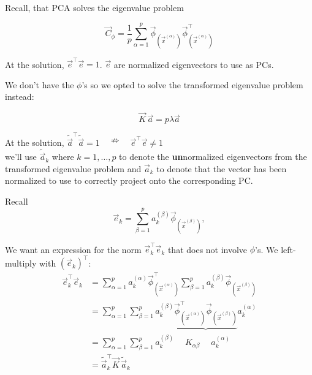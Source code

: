 \begin{frame}{\subsubsecname}

Recall, that PCA solves the eigenvalue problem

\begin{equation} 
\vec C_{\phi} = \frac{1}{p} \sum_{\alpha=1}^{p} \vec{\phi}_{(\vec{x}^{(\alpha)})} \vec{\phi}^{\top}_{(\vec{x}^{(\alpha)})}
\end{equation}

At the solution, $\vec e^\top \vec e = 1$. $\vec e$ are normalized eigenvectors to use as PCs.

We don't have the $\phi$'s so we opted to solve the transformed eigenvalue problem instead:

\begin{equation}
	\vec{K} \, \vec{a} = p \lambda \vec{a}
\end{equation}

At the solution, $\widetilde{\vec a}^\top \widetilde{\vec a} = 1 \quad \nRightarrow \quad \vec e^\top \vec e \ne 1$\\

we'll use $\widetilde{\vec a}_k$ where $k=1,\ldots,p$ to denote the \textbf{un}normalized eigenvectors from the transformed eigenvalue problem and $\vec a_k$ to denote that the vector has been normalized to use to correctly project onto the corresponding PC.

\end{frame}

\begin{frame}{\subsubsecname}

Recall
\begin{equation}
\label{eq:ephik}
\vec e_k = \sum^{p}_{\beta=1} a_k^{(\beta)} \vec{\phi}_{(\vec{x}^{(\beta)})},
\end{equation}

We want an expression for the norm $\vec e^{\top}_k \vec e_k$ that does not involve $\phi$'s. We left-multiply with $\left(\vec e_k\right)^\top$:
\begin{align}
\vec e^{\top}_k \vec e_k &= \sum^{p}_{\alpha=1}  a_k^{(\alpha)} \vec{\phi}_{(\vec{x}^{(\alpha)})}^\top \sum^{p}_{\beta=1} a_k^{(\beta)} \vec{\phi}_{(\vec{x}^{(\beta)})} \\
&= \sum^{p}_{\alpha=1}  \sum^{p}_{\beta=1}  a_k^{(\beta)}  \underbrace{\vec{\phi}_{(\vec{x}^{(\alpha)})}^\top  \vec{\phi}_{(\vec{x}^{(\beta)})}} a_k^{(\alpha)} \\
&= \sum^{p}_{\alpha=1}  \sum^{p}_{\beta=1}  a_k^{(\beta)} \quad \; K_{\alpha\beta} \quad \; a_k^{(\alpha)} \\
&= \widetilde {\vec a}_k^\top \vec K \, \widetilde {\vec a}_k
\end{align}

\end{frame}

